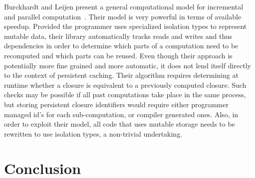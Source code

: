 \documentclass{llncs}
\begin{document}
Burckhardt and Leijen present a general computational model for
incremental and parallel computation~\cite{BurckhardtLeijen11}. Their
model is very powerful in terms of available speedup.  Provided the
programmer uses specialized isolation types to represent mutable data,
their library automatically tracks reads and writes and thus
dependencies in order to determine which parts of a computation need
to be recomputed and which parts can be reused. Even though their
approach is potentially more fine grained and more automatic, it does
not lend itself directly to the context of persistent caching. Their
algorithm requires determining at runtime whether a closure is
equivalent to a previously computed closure. Such checks may be
possible if all past computations take place in the same process, but
storing persistent closure identifiers would require either programmer managed
id's for each sub-computation, or compiler generated ones. Also, in
order to exploit their model, all code that uses mutable storage needs
to be rewritten to use isolation types, a non-trivial undertaking.




\section{Conclusion}



\end{document}

